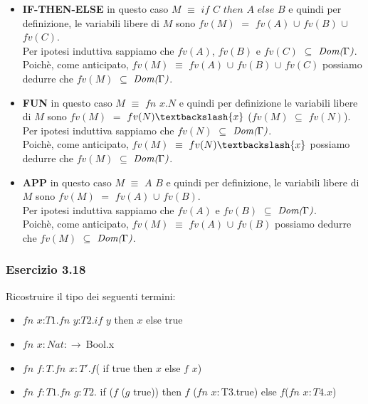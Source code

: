 \begin{itemize}
\begin{itemize}[label=$\star$]
		\item \textbf{IF-THEN-ELSE} in questo caso $M$ $\equiv$ $if$ $C$ $then$ $A$ $else$ $B$ e quindi per definizione, le variabili libere di $M$ sono $fv(M)$ $=$ $fv(A)$ $\cup$ $fv(B)$ $\cup$ $fv(C)$.\\ Per ipotesi induttiva sappiamo che $fv(A)$, $fv(B)$ e $fv(C)$ $\subseteq$ $\emph{Dom(}\Gamma\emph{)}$.\\Poich\`e, come anticipato, $fv(M)$ $\equiv$ $fv(A)$ $\cup$ $fv(B)$ $\cup$ $fv(C)$ possiamo dedurre che $fv(M)$ $\subseteq$ $\emph{Dom(}\Gamma\emph{)}$.

		\item \textbf{FUN}  in questo caso $M$ $\equiv$ $fn$ $x.N$ e quindi per definizione le variabili libere di $M$ sono 
		$fv(M)$ $=$ $fv(N)\textbackslash \{x\}$ ($fv(M)$ $\subseteq$ $fv(N)$).\\ Per ipotesi induttiva sappiamo che $fv(N)$ $\subseteq$ $\emph{Dom(}\Gamma\emph{)}$.\\Poich\`e, come anticipato, $fv(M)$ $\equiv$ $fv(N)\textbackslash \{x\}$ possiamo dedurre che $fv(M)$ $\subseteq$ $\emph{Dom(}\Gamma\emph{)}$. 
		
		\item \textbf{APP} in questo caso $M$ $\equiv$ $A$ $B$ e quindi per definizione, le variabili libere di $M$ sono $fv(M)$ $=$ $fv(A)$ $\cup$ $fv(B)$.\\ Per ipotesi induttiva sappiamo che $fv(A)$ e $fv(B)$ $\subseteq$ $\emph{Dom(}\Gamma\emph{)}$.\\Poich\`e, come anticipato, $fv(M)$ $\equiv$ $fv(A)$ $\cup$ $fv(B)$ possiamo dedurre che $fv(M)$ $\subseteq$ $\emph{Dom(}\Gamma\emph{)}$. 
  
		\end{itemize}

\end{itemize}

\subsubsection*{Esercizio 3.18}
Ricostruire il tipo dei seguenti termini:
\begin{itemize}
\item $fn$ $x$:$T1.fn$ $y$:$T2.if$ $y$ then $x$ else true
\item $fn$ $x:Nat:\rightarrow\:$Bool.x
\item $fn$ $f:T.fn$ $x:T'.f$( if true  then  $x$  else  $f$ $x$)
\item $fn$ $f:T1.fn$ $g:T2.$ if ($f$ ($g$ true)) then $f$ ($fn$ $x:$T3.true) else $f$($fn$ $x:T4.x$)
\end{itemize}

